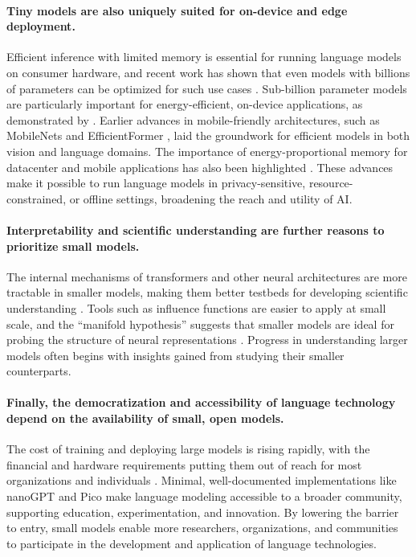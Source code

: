 \paragraph{Tiny models are also uniquely suited for on-device and edge deployment.} Efficient inference with limited memory is essential for running language models on consumer hardware, and recent work has shown that even models with billions of parameters can be optimized for such use cases \citep{alizadeh2024llm}. Sub-billion parameter models are particularly important for energy-efficient, on-device applications, as demonstrated by \citet{liu2024mobilellm}. Earlier advances in mobile-friendly architectures, such as MobileNets \citep{howard2017mobilenets} and EfficientFormer \citep{li2022efficientformer}, laid the groundwork for efficient models in both vision and language domains. The importance of energy-proportional memory for datacenter and mobile applications has also been highlighted \citep{malladi2012towards}. These advances make it possible to run language models in privacy-sensitive, resource-constrained, or offline settings, broadening the reach and utility of AI.

\paragraph{Interpretability and scientific understanding are further reasons to prioritize small models.} The internal mechanisms of transformers and other neural architectures are more tractable in smaller models, making them better testbeds for developing scientific understanding \citep{elhage2021mathematical, elhage2022toy, bircken2023monosemanticity, anthropic2023components}. Tools such as influence functions are easier to apply at small scale, and the “manifold hypothesis” suggests that smaller models are ideal for probing the structure of neural representations \citep{olah2014manifolds}. Progress in understanding larger models often begins with insights gained from studying their smaller counterparts.

\paragraph{Finally, the democratization and accessibility of language technology depend on the availability of small, open models.} The cost of training and deploying large models is rising rapidly, with the financial and hardware requirements putting them out of reach for most organizations and individuals \citep{cottier2024rising, sharir2020cost}. Minimal, well-documented implementations like nanoGPT \citep{karpathy2023nanogpt} and Pico \citep{diehlmartinez2025pico} make language modeling accessible to a broader community, supporting education, experimentation, and innovation. By lowering the barrier to entry, small models enable more researchers, organizations, and communities to participate in the development and application of language technologies.

